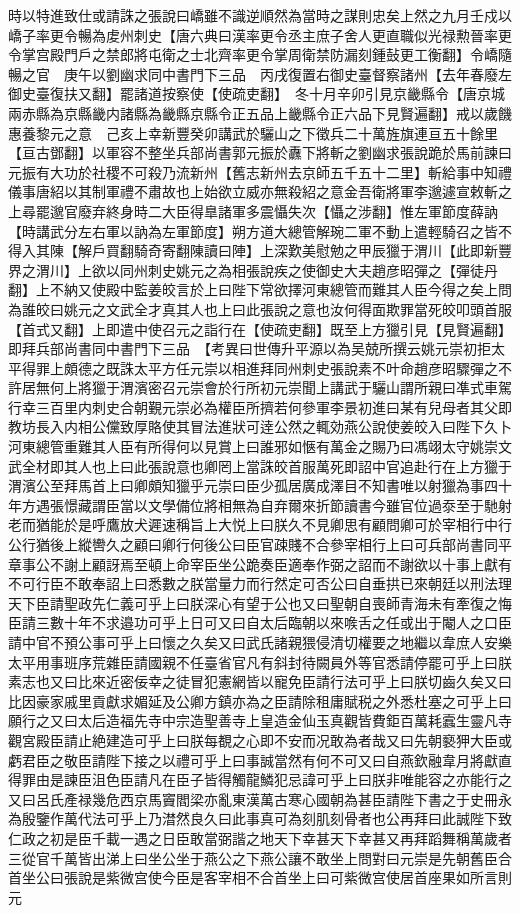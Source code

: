 時以特進致仕或請誅之張說曰嶠雖不識逆順然為當時之謀則忠矣上然之九月壬戍以嶠子率更令暢為䖍州刺史【唐六典曰漢率更令丞主庶子舍人更直職似光禄勲晉率更令掌宫殿門戶之禁郎將屯衛之士北齊率更令掌周衛禁防漏刻鍾鼔更工衡翻】令嶠隨暢之官　庚午以劉幽求同中書門下三品　丙戌復置右御史臺督察諸州【去年春廢左御史臺復扶又翻】罷諸道按察使【使疏吏翻】　冬十月辛卯引見京畿縣令【唐京城兩赤縣為京縣畿内諸縣為畿縣京縣令正五品上畿縣令正六品下見賢遍翻】戒以歲饑惠養黎元之意　己亥上幸新豐癸卯講武於驪山之下徵兵二十萬旌旗連亘五十餘里【亘古鄧翻】以軍容不整坐兵部尚書郭元振於纛下將斬之劉幽求張說跪於馬前諫曰元振有大功於社稷不可殺乃流新州【舊志新州去京師五千五十二里】斬給事中知禮儀事唐紹以其制軍禮不肅故也上始欲立威亦無殺紹之意金吾衛將軍李邈遽宣敕斬之上尋罷邈官廢弃終身時二大臣得臯諸軍多震懾失次【懾之涉翻】惟左軍節度薛訥【時講武分左右軍以訥為左軍節度】朔方道大總管解琬二軍不動上遣輕騎召之皆不得入其陳【解戶買翻騎奇寄翻陳讀曰陣】上深歎美慰勉之甲辰獵于渭川【此即新豐界之渭川】上欲以同州刺史姚元之為相張說疾之使御史大夫趙彦昭彈之【彈徒丹翻】上不納又使殿中監姜皎言於上曰陛下常欲擇河東總管而難其人臣今得之矣上問為誰皎曰姚元之文武全才真其人也上曰此張說之意也汝何得面欺罪當死皎叩頭首服【首式又翻】上即遣中使召元之詣行在【使疏吏翻】既至上方獵引見【見賢遍翻】即拜兵部尚書同中書門下三品　【考異曰世傳升平源以為吴兢所撰云姚元崇初拒太平得罪上頗德之既誅太平方任元崇以相進拜同州刺史張說素不叶命趙彦昭驟彈之不許居無何上將獵于渭濱密召元崇會於行所初元崇聞上講武于驪山謂所親曰凖式車駕行幸三百里内刺史合朝覲元崇必為權臣所擠若何參軍李景初進曰某有兒母者其父即教坊長入内相公儻致厚賂使其冒法進狀可逹公然之輒効燕公說使姜皎入曰陛下久卜河東總管重難其人臣有所得何以見賞上曰誰邪如愜有萬金之賜乃曰馮翊太守姚崇文武全材即其人也上曰此張說意也卿罔上當誅皎首服萬死即詔中官追赴行在上方獵于渭濱公至拜馬首上曰卿頗知獵乎元崇曰臣少孤居廣成澤目不知書唯以射獵為事四十年方遇張憬藏謂臣當以文學備位將相無為自弃爾來折節讀書今雖官位過沗至于馳射老而猶能於是呼鷹放犬遲速稱旨上大悦上曰朕久不見卿思有顧問卿可於宰相行中行公行猶後上縱轡久之顧曰卿行何後公曰臣官疎賤不合參宰相行上曰可兵部尚書同平章事公不謝上顧訝焉至頓上命宰臣坐公跪奏臣適奉作弼之詔而不謝欲以十事上獻有不可行臣不敢奉詔上曰悉數之朕當量力而行然定可否公曰自垂拱已來朝廷以刑法理天下臣請聖政先仁義可乎上曰朕深心有望于公也又曰聖朝自喪師青海未有牽復之悔臣請三數十年不求邉功可乎上日可又曰自太后臨朝以來㗋舌之任或出于閹人之口臣請中官不預公事可乎上曰懷之久矣又曰武氏諸親猥侵清切權要之地繼以韋庶人安樂太平用事班序荒雜臣請國親不任臺省官凡有斜封待闕員外等官悉請停罷可乎上曰朕素志也又曰比來近密佞幸之徒冒犯憲網皆以寵免臣請行法可乎上曰朕切齒久矣又曰比因豪家戚里貢獻求媚延及公卿方鎮亦為之臣請除租庸賦税之外悉杜塞之可乎上曰願行之又曰太后造福先寺中宗造聖善寺上皇造金仙玉真觀皆費鉅百萬耗蠧生靈凡寺觀宮殿臣請止絶建造可乎上曰朕每覩之心即不安而况敢為者哉又曰先朝褻狎大臣或虧君臣之敬臣請陛下接之以禮可乎上曰事誠當然有何不可又曰自燕欽融韋月將獻直得罪由是諫臣沮色臣請凡在臣子皆得觸龍鱗犯忌諱可乎上曰朕非唯能容之亦能行之又曰呂氏產禄幾危西京馬竇閻梁亦亂東漢萬古寒心國朝為甚臣請陛下書之于史冊永為殷鑒作萬代法可乎上乃澘然良久曰此事真可為刻肌刻骨者也公再拜曰此誠陛下致仁政之初是臣千載一遇之日臣敢當弼諧之地天下幸甚天下幸甚又再拜蹈舞稱萬歲者三從官千萬皆出涕上曰坐公坐于燕公之下燕公讓不敢坐上問對曰元崇是先朝舊臣合首坐公曰張說是紫微宫使今臣是客宰相不合首坐上曰可紫微宫使居首座果如所言則元